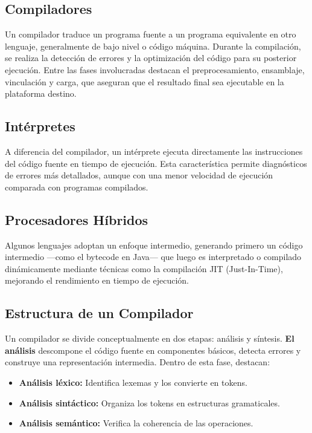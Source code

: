 \documentclass{article}
\begin{document}
\subsection*{Compiladores}

Un compilador traduce un programa fuente a un programa equivalente en otro lenguaje, generalmente de bajo nivel o código máquina. Durante la compilación, se realiza la detección de errores y la optimización del código para su posterior ejecución. Entre las fases involucradas destacan el preprocesamiento, ensamblaje, vinculación y carga, que aseguran que el resultado final sea ejecutable en la plataforma destino.

\subsection*{Intérpretes}

A diferencia del compilador, un intérprete ejecuta directamente las instrucciones del código fuente en tiempo de ejecución. Esta característica permite diagnósticos de errores más detallados, aunque con una menor velocidad de ejecución comparada con programas compilados.

\subsection*{Procesadores Híbridos}

Algunos lenguajes adoptan un enfoque intermedio, generando primero un código intermedio —como el bytecode en Java— que luego es interpretado o compilado dinámicamente mediante técnicas como la compilación JIT (Just-In-Time), mejorando el rendimiento en tiempo de ejecución.

\subsection*{Estructura de un Compilador}

Un compilador se divide conceptualmente en dos etapas: análisis y síntesis.  
\textbf{El análisis} descompone el código fuente en componentes básicos, detecta errores y construye una representación intermedia. Dentro de esta fase, destacan:
\begin{itemize}
    \item \textbf{Análisis léxico:} Identifica lexemas y los convierte en tokens.
    \item \textbf{Análisis sintáctico:} Organiza los tokens en estructuras gramaticales.
    \item \textbf{Análisis semántico:} Verifica la coherencia de las operaciones.
\end{itemize}
\end{document}

